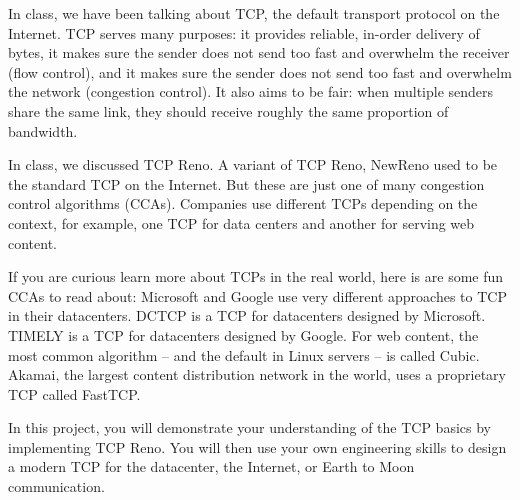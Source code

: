 
In class, we have been talking about TCP, the default transport protocol on the Internet. TCP serves many purposes: it provides reliable, in-order delivery of bytes, it makes sure the sender does not send too fast and overwhelm the receiver (flow control), and it makes sure the sender does not send too fast and overwhelm the network (congestion control). It also aims to be fair: when multiple senders share the same link, they should receive roughly the same proportion of bandwidth.

In class, we discussed TCP Reno. A variant of TCP Reno, NewReno used to be the standard TCP on the Internet. But these are just one of many congestion control algorithms (CCAs). Companies use different TCPs depending on the context, for example, one TCP for data centers and another for serving web content.

If you are curious learn more about TCPs in the real world, here is are some fun CCAs to read about:
Microsoft and Google use very different approaches to TCP in their datacenters. DCTCP is a TCP for datacenters designed by Microsoft. TIMELY is a TCP for datacenters designed by Google.
For web content, the most common algorithm -- and the default in Linux servers -- is called Cubic. Akamai, the largest content distribution network in the world, uses a proprietary TCP called FastTCP.

In this project, you will demonstrate your understanding of the TCP basics by implementing TCP Reno. You will then use your own engineering skills to design a modern TCP for the datacenter, the Internet, or Earth to Moon communication.


